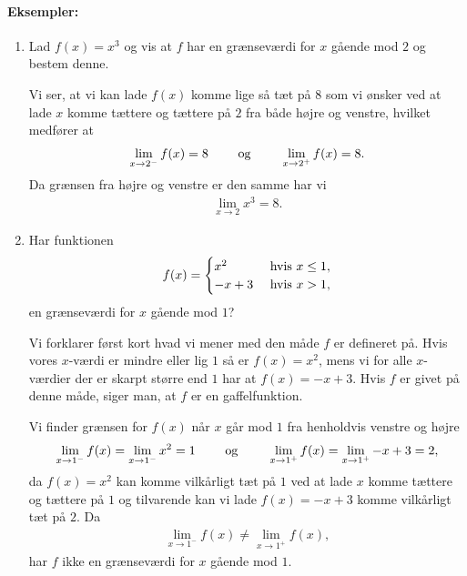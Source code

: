 \paragraph*{Eksempler:}
\begin{enumerate}
\item Lad $f(x)=x^3$ og vis at $f$ har en grænseværdi for $x$ gående mod $2$ og bestem denne.

Vi ser, at vi kan lade $f(x)$ komme lige så tæt på $8$ som vi ønsker ved at lade $x$ komme tættere og tættere på $2$ fra både højre og venstre, hvilket medfører at
\begin{align*}
\lim_{x \to 2^-} f(x) = 8 \qquad \textup{ og } \qquad \lim_{x \to 2^+} f(x) = 8.
\end{align*}
Da grænsen fra højre og venstre er den samme har vi 
\begin{align*}
\lim_{x \to 2} x^3=8.
\end{align*}
\item Har funktionen
\begin{align*}
f (x) = 
\begin{cases}
x^2 & \textup{ hvis } x \leq 1, \\
-x+3 & \textup{ hvis } x > 1,
\end{cases}
\end{align*}
en grænseværdi for $x$ gående mod $1$?

Vi forklarer først kort hvad vi mener med den måde $f$ er defineret på. Hvis vores $x$-værdi er mindre eller lig $1$ så er $f(x)=x^2$, mens vi for alle $x$-værdier der er skarpt større end $1$ har at $f(x)=-x+3$. Hvis $f$ er givet på denne måde, siger man, at $f$ er en gaffelfunktion.

Vi finder grænsen for $f(x)$ når $x$ går mod $1$ fra henholdvis venstre og højre
\begin{align*}
\lim_{x \to 1^-} f(x) = \lim_{x \to 1^-} x^2 = 1 \qquad \textup{ og } \qquad \lim_{x \to 1^+} f(x)= \lim_{x \to 1^+} -x+3 = 2, 
\end{align*} 
da $f(x)=x^2$ kan komme vilkårligt tæt på $1$ ved at lade $x$ komme tættere og tættere på $1$ og tilvarende kan vi lade $f(x)=-x+3$ komme vilkårligt tæt på $2$. Da
\begin{align*}
\lim_{x \to 1^-} f(x) \neq \lim_{x \to 1^+} f(x),
\end{align*}
har $f$ ikke en grænseværdi for $x$ gående mod $1$.
\end{enumerate}
